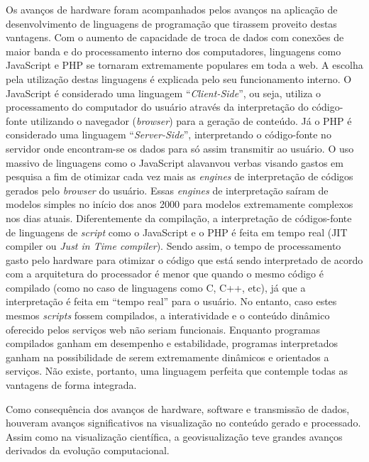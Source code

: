 Os avanços de hardware foram acompanhados pelos avanços na aplicação de desenvolvimento de linguagens de programação que tirassem proveito destas vantagens. Com o aumento de capacidade de troca de dados com conexões de maior banda e do processamento interno dos computadores, linguagens como JavaScript e PHP se tornaram extremamente populares em toda a web. A escolha pela utilização destas linguagens é explicada pelo seu funcionamento interno. O JavaScript é considerado uma linguagem “\textit{Client-Side}”, ou seja, utiliza o processamento do computador do usuário através da interpretação do código-fonte utilizando o navegador (\textit{browser}) para a geração de conteúdo. Já o PHP é considerado uma linguagem “\textit{Server-Side}”, interpretando o código-fonte no servidor onde encontram-se os dados para só assim transmitir ao usuário. O uso massivo de linguagens como o JavaScript alavanvou verbas visando gastos em pesquisa a fim de otimizar cada vez mais as \textit{engines} de interpretação de códigos gerados pelo \textit{browser} do usuário. Essas \textit{engines} de interpretação saíram de modelos simples no início dos anos 2000 para modelos extremamente complexos nos dias atuais. Diferentemente da compilação, a interpretação de códigos-fonte de linguagens de \textit{script} como o JavaScript e o PHP é feita em tempo real (JIT compiler ou \textit{Just in Time compiler}). Sendo assim, o tempo de processamento gasto pelo hardware para otimizar o código que está sendo interpretado de acordo com a arquitetura do processador é menor que quando o mesmo código é compilado (como no caso de linguagens como C, C++, etc), já que a interpretação é feita em “tempo real” para o usuário. No entanto, caso estes mesmos \textit{scripts} fossem compilados, a interatividade e o conteúdo dinâmico oferecido pelos serviços web não seriam funcionais. Enquanto programas compilados ganham em desempenho e estabilidade, programas interpretados ganham na possibilidade de serem extremamente dinâmicos e orientados a serviços. Não existe, portanto, uma linguagem perfeita que contemple todas as vantagens de forma integrada. 

Como consequência dos avanços de hardware, software e transmissão de dados, houveram avanços significativos na visualização no conteúdo gerado e processado. Assim como na visualização científica, a geovisualização teve grandes avanços derivados da evolução computacional. 

